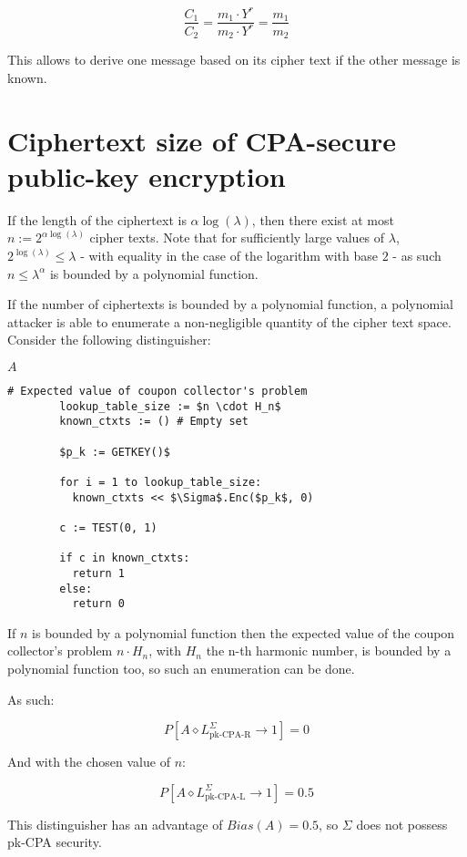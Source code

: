 \documentclass[a4paper]{scrreprt}
\begin{document}
\[
  \frac{C_1}{C_2} = \frac{m_1 \cdot Y^r}{m_2 \cdot Y^r} = \frac{m_1}{m_2}
\]

This allows to derive one message based on its cipher text if the other message
is known.

\section{Ciphertext size of CPA-secure public-key encryption}

If the length of the ciphertext is $\alpha \log(\lambda)$, then there exist at
most $n := 2^{\alpha \log(\lambda)}$ cipher texts. Note that for sufficiently large
values of $\lambda$, $2^{\log(\lambda)} \leq \lambda$ - with equality in the
case of the logarithm with base $2$ -  as such $n \leq
\lambda^\alpha$ is bounded by a polynomial function.

If the number of ciphertexts is bounded by a polynomial function, a polynomial
attacker is able to enumerate a non-negligible quantity of the cipher text
space. Consider the following distinguisher:

\begin{library}{$A$}
	\begin{lstlisting}[mathescape=true,autogobble=true]
		# Expected value of coupon collector's problem
		lookup_table_size := $n \cdot H_n$
		known_ctxts := () # Empty set

		$p_k := GETKEY()$

		for i = 1 to lookup_table_size:
		  known_ctxts << $\Sigma$.Enc($p_k$, 0)

		c := TEST(0, 1)

		if c in known_ctxts:
		  return 1
		else:
		  return 0
	\end{lstlisting}
\end{library}

If $n$ is bounded by a polynomial function then the expected value of the
coupon collector's problem $n \cdot H_n$, with $H_n$ the n-th harmonic number,
is bounded by a polynomial function too, so such an enumeration can be done.

As such:

\[
	P\left[A \diamond L^\Sigma_{\text{pk-CPA-R}} \rightarrow 1\right] = 0
\]

And with the chosen value of $n$:

\[
	P\left[A \diamond L^\Sigma_{\text{pk-CPA-L}} \rightarrow 1\right] = 0.5
\]

This distinguisher has an advantage of $Bias(A) = 0.5$, so $\Sigma$ does not
possess pk-CPA security.
\end{document}
